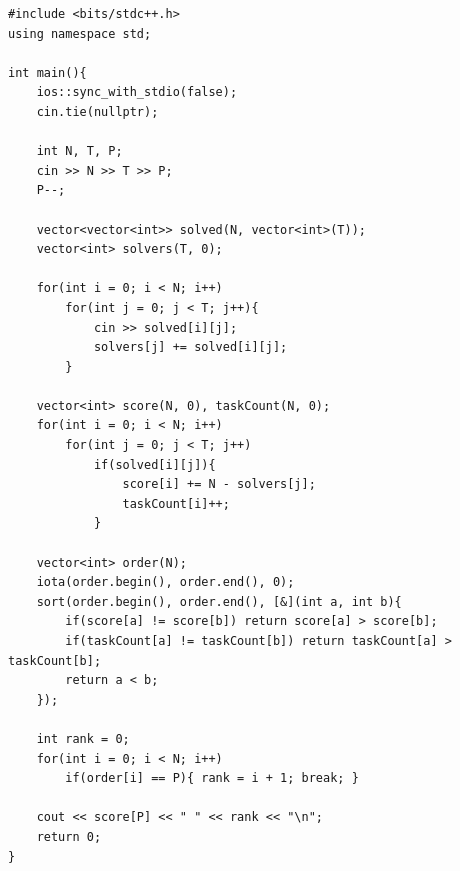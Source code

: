 \documentclass[11pt,a4paper]{article}
\begin{document}
\begin{lstlisting}
#include <bits/stdc++.h>
using namespace std;

int main(){
    ios::sync_with_stdio(false);
    cin.tie(nullptr);

    int N, T, P;
    cin >> N >> T >> P;
    P--;

    vector<vector<int>> solved(N, vector<int>(T));
    vector<int> solvers(T, 0);

    for(int i = 0; i < N; i++)
        for(int j = 0; j < T; j++){
            cin >> solved[i][j];
            solvers[j] += solved[i][j];
        }

    vector<int> score(N, 0), taskCount(N, 0);
    for(int i = 0; i < N; i++)
        for(int j = 0; j < T; j++)
            if(solved[i][j]){
                score[i] += N - solvers[j];
                taskCount[i]++;
            }

    vector<int> order(N);
    iota(order.begin(), order.end(), 0);
    sort(order.begin(), order.end(), [&](int a, int b){
        if(score[a] != score[b]) return score[a] > score[b];
        if(taskCount[a] != taskCount[b]) return taskCount[a] > taskCount[b];
        return a < b;
    });

    int rank = 0;
    for(int i = 0; i < N; i++)
        if(order[i] == P){ rank = i + 1; break; }

    cout << score[P] << " " << rank << "\n";
    return 0;
}
\end{lstlisting}
\end{document}
